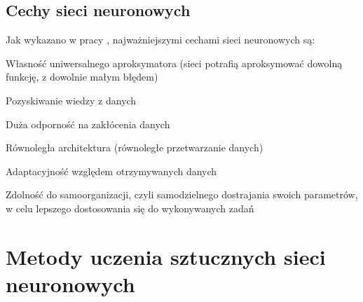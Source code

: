 \newpage
\subsection{Cechy sieci neuronowych}
Jak wykazano w pracy \cite{dudek:wyklad:sieciAproksymacja}, najważniejszymi cechami sieci neuronowych są:
\begin{enumerate*}
\item Własność uniwersalnego aproksymatora (sieci potrafią aproksymować dowolną funkcję, z dowolnie małym błędem)
\item Pozyskiwanie wiedzy z danych
\item Duża odporność na zakłócenia danych
\item Równoległa architektura (równoległe przetwarzanie danych)
\item Adaptacyjność względem otrzymywanych danych
\item Zdolność do samoorganizacji, czyli samodzielnego dostrajania swoich
parametrów, w celu lepszego dostosowania się do wykonywanych zadań
\end{enumerate*}

\newpage
\section{Metody uczenia sztucznych sieci neuronowych}